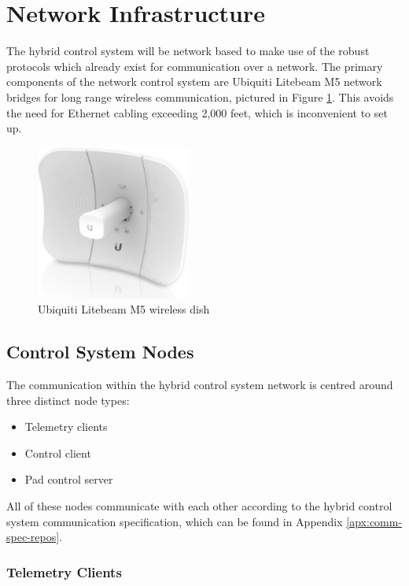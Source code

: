 \section{Network Infrastructure}

The hybrid control system will be network based to make use of the robust protocols which already exist for
communication over a network. The primary components of the network control system are Ubiquiti Litebeam M5 network
bridges for long range wireless communication, pictured in Figure \ref{fig:ubiquiti-dish}. This avoids the need for
Ethernet cabling exceeding 2,000 feet, which is inconvenient to set up.

\begin{figure}[H]
    \center
    \includegraphics[width=2in]{assets/images/ubiquiti-dish.jpg}
    \caption{Ubiquiti Litebeam M5 wireless dish \cite{ubiquiti-dish}}
    \label{fig:ubiquiti-dish}
\end{figure}

\subsection{Control System Nodes}

The communication within the hybrid control system network is centred around three distinct node types:

\begin{itemize}
    \item Telemetry clients
    \item Control client
    \item Pad control server
\end{itemize}

All of these nodes communicate with each other according to the hybrid control system communication specification,
which can be found in Appendix \ref{apx:comm-spec-repos}.

\subsubsection{Telemetry Clients}

